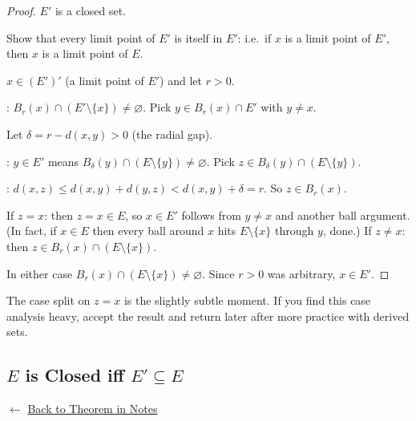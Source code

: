 \begin{proof}
\Claim $E'$ is a closed set.

\Strategy Show that every limit point of $E'$ is itself in $E'$:
i.e.\ if $x$ is a limit point of $E'$, then $x$ is a limit point of $E$.

\medskip
\Let $x \in (E')'$ (a limit point of $E'$) and let $r > 0$.

\ByDef: $B_r(x) \cap (E' \setminus \{x\}) \neq \varnothing$.
Pick $y \in B_r(x) \cap E'$ with $y \neq x$.

Let $\delta = r - d(x,y) > 0$ (the radial gap).

: $y \in E'$ means $B_\delta(y) \cap (E \setminus \{y\}) \neq \varnothing$.
Pick $z \in B_\delta(y) \cap (E \setminus \{y\})$.

: $d(x,z) \le d(x,y) + d(y,z) < d(x,y) + \delta = r$.
So $z \in B_r(x)$.

If $z = x$: then $z = x \in E$, so $x \in E'$ follows from $y \neq x$ and another ball argument.
(In fact, if $x \in E$ then every ball around $x$ hits $E \setminus \{x\}$ through $y$, done.)
If $z \neq x$: then $z \in B_r(x) \cap (E \setminus \{x\})$.

In either case $B_r(x) \cap (E \setminus \{x\}) \neq \varnothing$.
Since $r > 0$ was arbitrary, $x \in E'$. \AsReq
\end{proof}

\begin{remark*}
The case split on $z = x$ is the slightly subtle moment.
If you find this case analysis heavy, accept the result and return later
after more practice with derived sets.
\end{remark*}

\subsection*{$E$ is Closed iff $E' \subseteq E$}
\label{prf:closed-derived}

\begin{remark*}[Return]
$\leftarrow$ \hyperref[thm:closed-derived]{Back to Theorem in Notes}
\end{remark*}

